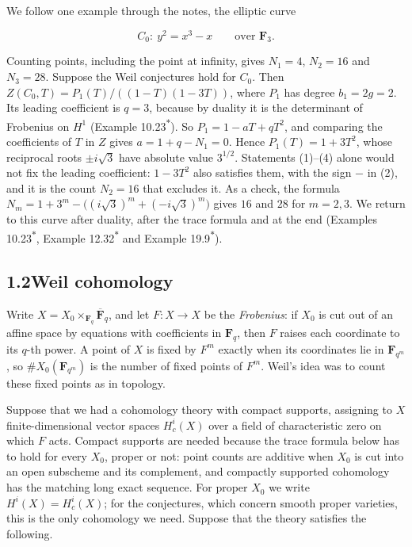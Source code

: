 \documentclass[11pt]{article}
\newcommand{\bpout}[1]{#1\textsuperscript{\hyperlink{bp-outside}{\ensuremath{\ast}}}}
\begin{document}
We follow one example through the notes, the elliptic curve

\[
C_0\colon\ y^2=x^3-x\qquad\text{over }\mathbf F_3 .
\]

Counting points, including the point at infinity, gives \(N_1=4\), \(N_2=16\) and \(N_3=28\). Suppose the Weil conjectures hold for \(C_0\). Then \(Z(C_0,T)=P_1(T)/((1-T)(1-3T))\), where \(P_1\) has degree \(b_1=2g=2\). Its leading coefficient is \(q=3\), because by duality it is the determinant of Frobenius on \(H^1\) (Example \bpout{10.23}). So \(P_1=1-aT+qT^2\), and comparing the coefficients of \(T\) in \(Z\) gives \(a=1+q-N_1=0\). Hence \(P_1(T)=1+3T^2\), whose reciprocal roots \(\pm i\sqrt3\) have absolute value \(3^{1/2}\). Statements (1)–(4) alone would not fix the leading coefficient: \(1-3T^2\) also satisfies them, with the sign \(-\) in (2), and it is the count \(N_2=16\) that excludes it. As a check, the formula \(N_m=1+3^m-\bigl((i\sqrt3)^m+(-i\sqrt3)^m\bigr)\) gives \(16\) and \(28\) for \(m=2,3\). We return to this curve after duality, after the trace formula and at the end (Examples \bpout{10.23}, \bpout{Example 12.32} and \bpout{Example 19.9}).


\subsection*{\texorpdfstring{1.2\quad Weil cohomology}{1.2 Weil cohomology}}
\label{bp5}%
\label{bp6}%
Write \(X=X_0\times_{\mathbf F_q}\overline{\mathbf F}_q\), and let \(F:X\to X\) be the \emph{Frobenius}: if \(X_0\) is cut out of an affine space by equations with coefficients in \(\mathbf F_q\), then \(F\) raises each coordinate to its \(q\)-th power. A point of \(X\) is fixed by \(F^m\) exactly when its coordinates lie in \(\mathbf F_{q^m}\), so \(\#X_0(\mathbf F_{q^m})\) is the number of fixed points of \(F^m\). Weil's idea was to count these fixed points as in topology.

Suppose that we had a cohomology theory with compact supports, assigning to \(X\) finite-dimensional vector spaces \(H^i_c(X)\) over a field of characteristic zero on which \(F\) acts. Compact supports are needed because the trace formula below has to hold for every \(X_0\), proper or not: point counts are additive when \(X_0\) is cut into an open subscheme and its complement, and compactly supported cohomology has the matching long exact sequence. For proper \(X_0\) we write \(H^i(X)=H^i_c(X)\); for the conjectures, which concern smooth proper varieties, this is the only cohomology we need. Suppose that the theory satisfies the following.
\end{document}
